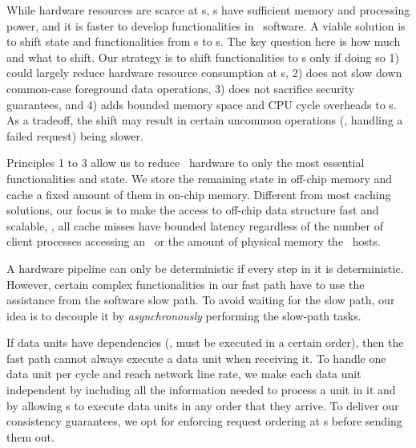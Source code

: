 While hardware resources are scarce at \MN{}s, \CN{}s have sufficient memory and processing power, and it is faster to develop functionalities in \CN\ software.
A viable solution is to shift state and functionalities from \MN{}s to \CN{}s.
The key question here is how much and what to shift.
Our strategy is to shift functionalities to \CN{}s only if doing so 1) could largely reduce hardware resource consumption at \MN{}s, 2) does not slow down common-case foreground data operations, 3) does not sacrifice security guarantees, and 4) adds bounded memory space and CPU cycle overheads to \CN{}s.
As a tradeoff, the shift may result in certain uncommon operations (\eg, handling a failed request) being slower.

Principles 1 to 3 allow us to reduce \MN\ hardware to only the most essential functionalities and state. 
We store the remaining state in off-chip memory and cache a fixed amount of them in on-chip memory.
Different from most caching solutions, our focus is to make the access to off-chip data structure fast and scalable,
\ie, all cache misses have bounded latency regardless of the number of client processes accessing an \MN\ or the amount of physical memory the \MN\ hosts.

A hardware pipeline can only be deterministic if every step in it is deterministic.
However, certain complex functionalities in our fast path have to use the assistance from the software slow path.
To avoid waiting for the slow path, our idea is to decouple it by {\em asynchronously} performing the slow-path tasks.
\fi

If data units have dependencies (\eg, must be executed in a certain order), then the fast path cannot always execute a data unit when receiving it.
To handle one data unit per cycle and reach network line rate, we make each data unit independent by including all the information needed to process a unit in it and by allowing \MN{}s to execute data units in any order that they arrive.
To deliver our consistency guarantees, we opt for enforcing request ordering at \CN{}s before sending them out.


